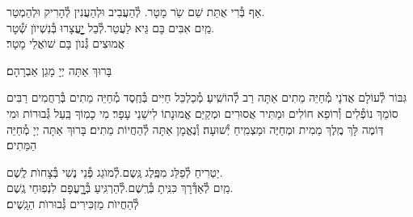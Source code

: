 \documentclass[twoside, openany, parskip=half, 11pt]{book}
\begin{document}


אַף בְּ֯רִי אֻתַּת שֵׁם שַֹר מָטָר. \hfill לְ֯הַעֲבִיב וּלְהַעֲנִין לְ֯הָרִיק וּלְהַמְטַר.\\
מַֽיִם אִבִּים בָּם גֵּיא לַעֲטַר.\hfill לְ֯בַל יׇׇׇׇׇׇעֳצָרוּ בְּ֯נִשְׁיוׂן שְׁ֯טָר.\\
אֲמוּצִים גְּ֯נוׂן בָּם שׁוׂאֲלֵי מָטָר׃



בָּרוּךְ אַתָּה יְיָ מָגֵן אַבְרָהָם׃

גִּבּוֹר לְ֯עוֹלָם אֲדֹנָי מְ֯חַיֵּה מֵתִים אַתָּה רַב לְ֯הוֹשִֽׁיעַ׃ מְ֯כַלְכֵּל חַיִּים בְּ֯חֶֽסֶד מְ֯חַיֵּה מֵתִים בְּ֯רַחֲמִים רַבִּים סוֹמֵךְ נוֹפְ֯לִים וְ֯רוֹפֵא חוֹלִים וּמַתִּיר אֲסוּרִים וּמְקַיֵּם אֱמוּנָתוֹ לִישֵׁנֵי עָפָר׃ מִי כָמֽוֹךָ בַּֽעַל גְּ֯בוּרוֹת וּמִי דּֽוֹמֶה לָּךְ מֶֽלֶךְ מֵמִית וּמְחַיֶּה וּמַצְמִֽיחַ יְ֯שׁוּעָה׃ וְ֯נֶאֱמָן אַתָּה לְ֯הַחֲיוֹת מֵתִים׃ בָּרוּךְ אַתָּה יְיָ מְ֯חַיֵּה הַמֵּתִים׃





יַטְרִיחַ לְ֯פַלֵּג מִפֶּֽלֶג גֶּֽשֶם.\hfill לְ֯מוׂגֵג פְּ֯נֵי נֶשִׁי בְּ֯צָחוׂת לֶֽשֶׁם.\\
מַֽיִם לְ֯אַדְּ֯רָךְ כִּנִּֽיתָ בְּ֯רֶֽשֶׁם.\hfill לְ֯הַרְגִּֽיעַ בְּ֯רׇׇׇׇעֳפָם לִנְפֽוּחֵי גֶֽשֶׁם.\\
לְ֯הַחֲיוׂת מַזְכִּירִים גְּ֯בוּרוׂת הַגָֽשֶׁים׃
\end{document}
